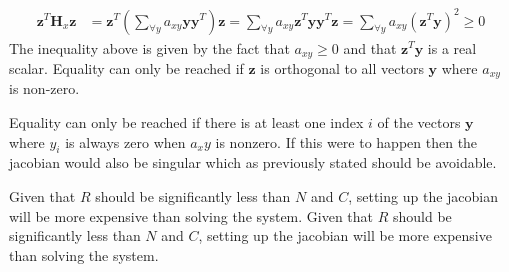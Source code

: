 \begin{align}
\mathbf{z}^T\mathbf{H}_x\mathbf{z} &= \mathbf{z}^T\left(\sum_{\forall y}a_{xy}\mathbf{y}\mathbf{y}^T\right)\mathbf{z} 
= \sum_{\forall y}a_{xy}\mathbf{z}^T\mathbf{y}\mathbf{y}^T\mathbf{z} 
= \sum_{\forall y}a_{xy}\left(\mathbf{z}^T\mathbf{y}\right)^2 \geq 0 
\end{align}
The inequality above is given by the fact that $a_{xy} \geq 0$ and that $\mathbf{z}^T\mathbf{y}$ is a real scalar. Equality can only be reached if $\mathbf{z}$ is orthogonal to all vectors $\mathbf{y}$ where $a_{xy}$ is non-zero. 

Equality can only be reached if there is at least one index $i$ of the vectors $\mathbf{y}$ where $y_i$ is always zero when $a_xy$ is nonzero. If this were to happen then the jacobian would also be singular which as previously stated should be avoidable. 

Given that $R$ should be significantly less than $N$ and $C$, setting up the jacobian will be more expensive than solving the system. Given that $R$ should be significantly less than $N$ and $C$, setting up the jacobian will be more expensive than solving the system.

